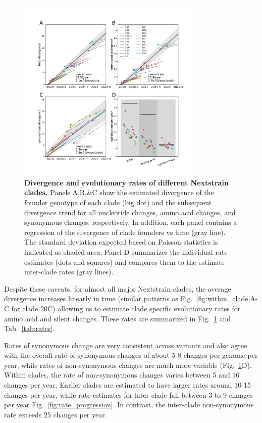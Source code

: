 \documentclass[aps,rmp, twocolumn]{revtex4}
\begin{document}
\begin{figure}
    \includegraphics[width=0.8\textwidth]{figures/rate_summary.pdf}
    \caption[]{{\bf Divergence and evolutionary rates of different Nextstrain clades.} Panels A,B,\&C show the estimated divergence of the founder genotype of each clade (big dot) and the subsequent divergence trend for all nucleotide changes, amino acid changes, and synonymous changes, respectively. In addition, each panel contains a regression of the divergence of clade founders vs time (gray line).
    The standard deviation expected based on Poisson statistics is indicated as shaded area.
    Panel D summarizes the individual rate estimates (dots and squares) and compares them to the estimate inter-clade rates (gray lines).
    \label{fig:rate_summary} }
\end{figure}

Despite these caveats, for almost all major Nextstrain clades, the average divergence increases linearly in time (similar patterns as Fig.~\ref{fig:within_clade}A-C for clade 20C) allowing us to estimate clade specific evolutionary rates for amino acid and silent changes.
These rates are summarized in Fig.~\ref{fig:rate_summary} and Tab.~\ref{tab:rates}.

Rates of synonymous change are very consistent across variants and also agree with the overall rate of synonymous changes of about 5-8 changes per genome per year, while rates of non-synonymous changes are much more variable (Fig.~\ref{fig:rate_summary}D).
Within clades, the rate of non-synonymous changes varies between 5 and 16 changes per year.
Earlier clades are estimated to have larger rates around 10-15 changes per year, while rate estimates for later clade fall  between 3 to 9 changes per year Fig.~\ref{fig:rate_progression}.
In contrast, the inter-clade non-synonymous rate exceeds 25 changes per year.
\end{document}
